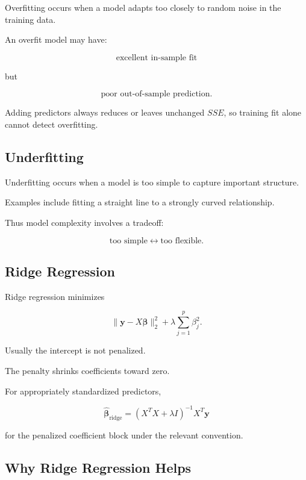 Overfitting occurs when a model adapts too closely to random noise in the
training data.

An overfit model may have:

\[
\boxed{
\text{excellent in-sample fit}
}
\]

but

\[
\boxed{
\text{poor out-of-sample prediction}.
}
\]

Adding predictors always reduces or leaves unchanged \(SSE\), so
training fit alone cannot detect overfitting.

\subsection{Underfitting}
\label{subsec:regression-underfitting}

Underfitting occurs when a model is too simple to capture important
structure.

Examples include fitting a straight line to a strongly curved
relationship.

Thus model complexity involves a tradeoff:

\[
\boxed{
\text{too simple}
\longleftrightarrow
\text{too flexible}.
}
\]

\subsection{Ridge Regression}
\label{subsec:ridge-regression}

Ridge regression minimizes

\[
\boxed{
\|\mathbf{y}-X\boldsymbol{\beta}\|_2^2
+
\lambda
\sum_{j=1}^{p}
\beta_j^2.
}
\]

Usually the intercept is not penalized.

The penalty shrinks coefficients toward zero.

For appropriately standardized predictors,

\[
\boxed{
\widehat{\boldsymbol{\beta}}_{\text{ridge}}
=
(X^TX+\lambda I)^{-1}
X^T\mathbf{y}
}
\]

for the penalized coefficient block under the relevant convention.

\subsection{Why Ridge Regression Helps}
\label{subsec:why-ridge}

